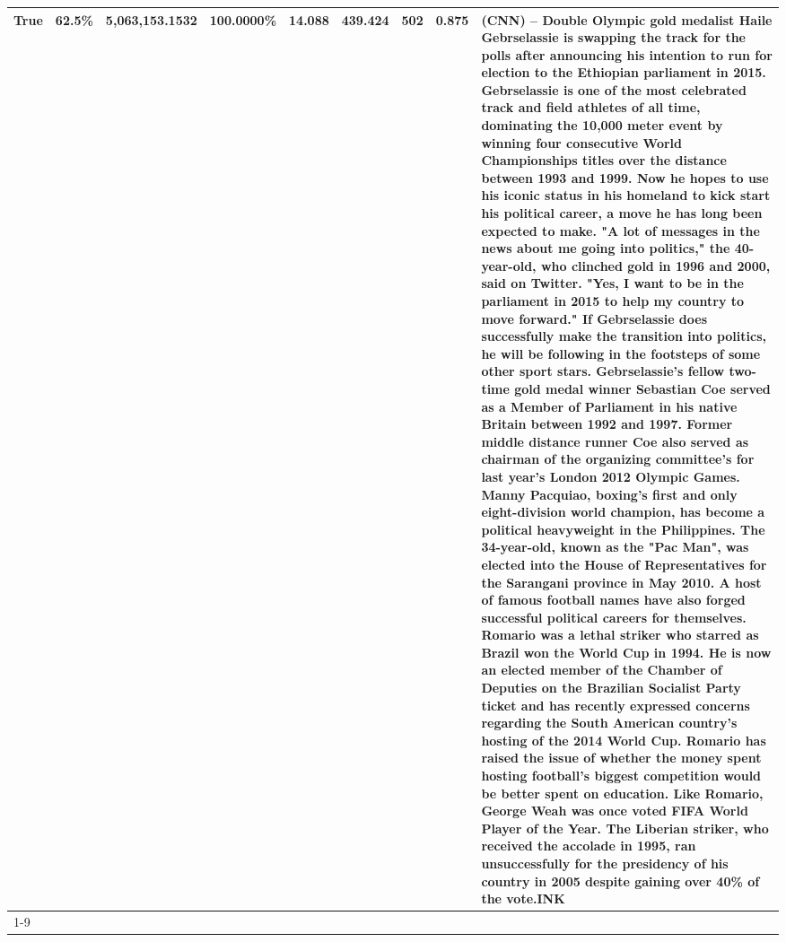 \begin{table}[H]
{\begin{tabular}{lllrlllll}
True & 62.5\% & 5,063,153.1532 & \bfseries \color{red} 100.0000\% & 14.088 & 439.424 & 502 & 0.875 & (CNN) -- Double Olympic gold medalist Haile Gebrselassie is swapping the track for the polls after announcing his intention to run for election to the Ethiopian parliament in 2015. Gebrselassie is one of the most celebrated track and field athletes of all time, dominating the 10,000 meter event by winning four consecutive World Championships titles over the distance between 1993 and 1999. Now he hopes to use his iconic status in his homeland to kick start his political career, a move he has long been expected to make. "A lot of messages in the news about me going into politics," the 40-year-old, who clinched gold in 1996 and 2000, said on Twitter. "Yes, I want to be in the parliament in 2015 to help my country to move forward." If Gebrselassie does successfully make the transition into politics, he will be following in the footsteps of some other sport stars. Gebrselassie's fellow two-time gold medal winner Sebastian Coe served as a Member of Parliament in his native Britain between 1992 and 1997. Former middle distance runner Coe also served as chairman of the organizing committee's for last year's London 2012 Olympic Games. Manny Pacquiao, boxing's first and only eight-division world champion, has become a political heavyweight in the Philippines. The 34-year-old, known as the "Pac Man", was elected into the House of Representatives for the Sarangani province in May 2010. A host of famous football names have also forged successful political careers for themselves. Romario was a lethal striker who starred as Brazil won the World Cup in 1994. He is now an elected member of the Chamber of Deputies on the Brazilian Socialist Party ticket and has recently expressed concerns regarding the South American country's hosting of the 2014 World Cup. Romario has raised the issue of whether the money spent hosting football's biggest competition would be better spent on education. Like Romario, George Weah was once voted FIFA World Player of the Year. The Liberian striker, who received the accolade in 1995, ran unsuccessfully for the presidency of his country in 2005 despite gaining over 40\% of the vote.INK \\
\cline{1-9}

\end{tabular}}
\end{table}
